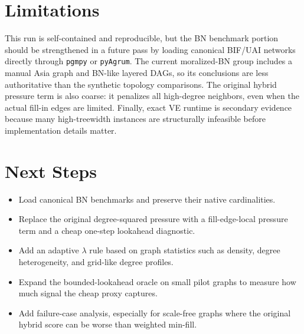 \documentclass[10pt]{article}
\begin{document}
\section*{Limitations}
This run is self-contained and reproducible, but the BN benchmark portion should be strengthened in a future pass by loading canonical BIF/UAI networks directly through \texttt{pgmpy} or \texttt{pyAgrum}. The current moralized-BN group includes a manual Asia graph and BN-like layered DAGs, so its conclusions are less authoritative than the synthetic topology comparisons. The original hybrid pressure term is also coarse: it penalizes all high-degree neighbors, even when the actual fill-in edges are limited. Finally, exact VE runtime is secondary evidence because many high-treewidth instances are structurally infeasible before implementation details matter.

\section*{Next Steps}
\begin{itemize}
\item Load canonical BN benchmarks and preserve their native cardinalities.
\item Replace the original degree-squared pressure with a fill-edge-local pressure term and a cheap one-step lookahead diagnostic.
\item Add an adaptive $\lambda$ rule based on graph statistics such as density, degree heterogeneity, and grid-like degree profiles.
\item Expand the bounded-lookahead oracle on small pilot graphs to measure how much signal the cheap proxy captures.
\item Add failure-case analysis, especially for scale-free graphs where the original hybrid score can be worse than weighted min-fill.
\end{itemize}
\end{document}
